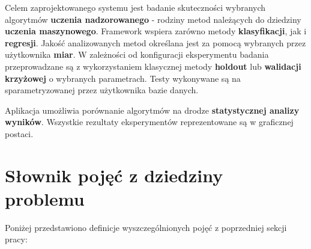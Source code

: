 \documentclass[12pt]{article}
\begin{document}
Celem zaprojektowanego systemu jest badanie skuteczności wybranych algorytmów \textbf{uczenia nadzorowanego} - rodziny metod należących do dziedziny \textbf{uczenia maszynowego}.
Framework wspiera zarówno metody \textbf{klasyfikacji}, jak i \textbf{regresji}. Jakość analizowanych metod określana jest za pomocą wybranych przez użytkownika \textbf{miar}. W zależności od konfiguracji eksperymentu badania przeprowadzane są z wykorzystaniem klasycznej metody \textbf{holdout} lub \textbf{walidacji krzyżowej} o wybranych parametrach.
Testy wykonywane są na sparametryzowanej przez użytkownika bazie danych.

Aplikacja umożliwia porównanie algorytmów na drodze \textbf{statystycznej analizy wyników}.
Wszystkie rezultaty eksperymentów reprezentowane są w graficznej postaci.


\section{Słownik pojęć z dziedziny problemu}

Poniżej przedstawiono definicje wyszczególnionych pojęć z poprzedniej sekcji pracy:
\end{document}
